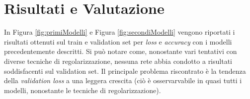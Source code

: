 \section{Risultati e Valutazione}
\label{cap4}

In Figura \ref{fig:primiModelli} e Figura \ref{fig:secondiModelli} vengono riportati i risultati ottenuti sul train e validation set per \textit{loss} e \textit{accuracy} con i modelli precedentemente descritti.
Si può notare come, nonostante vari tentativi con diverse tecniche di regolarizzazione, nessuna rete abbia condotto a risultati soddisfacenti sul validation set.
Il principale problema riscontrato è la tendenza della \textit{validation loss} a una leggera crescita (ciò è osservarvabile in quasi tutti i modelli, nonostante le tecniche di regolarizzazione).
